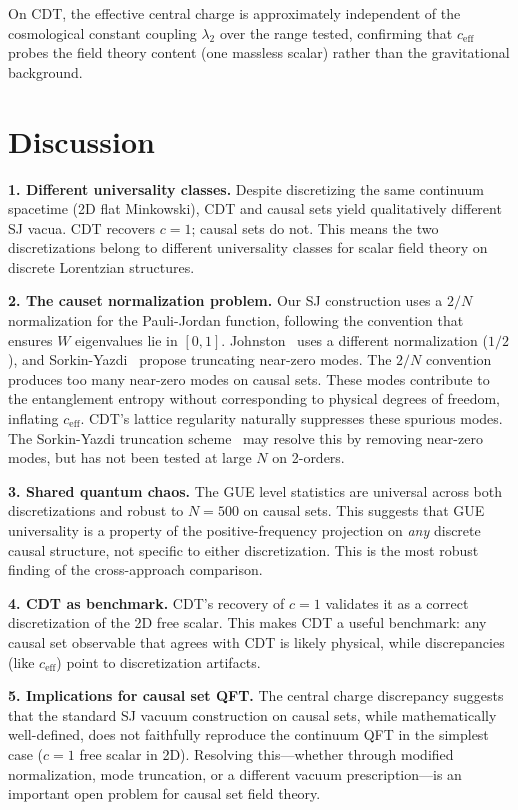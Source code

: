 \documentclass[aps,prd,twocolumn,superscriptaddress,nofootinbib]{revtex4-2}
\begin{document}
On CDT, the effective central charge is approximately independent of the cosmological constant coupling $\lambda_2$ over the range tested, confirming that $c_{\mathrm{eff}}$ probes the field theory content (one massless scalar) rather than the gravitational background.

\section{Discussion}

\textbf{1. Different universality classes.} Despite discretizing the same continuum spacetime (2D flat Minkowski), CDT and causal sets yield qualitatively different SJ vacua. CDT recovers $c = 1$; causal sets do not. This means the two discretizations belong to different universality classes for scalar field theory on discrete Lorentzian structures.

\textbf{2. The causet normalization problem.} Our SJ construction uses a $2/N$ normalization for the Pauli-Jordan function, following the convention that ensures $W$ eigenvalues lie in $[0,1]$. Johnston~\cite{johnston2009} uses a different normalization ($1/2$), and Sorkin-Yazdi~\cite{sorkin_yazdi2018} propose truncating near-zero modes. The $2/N$ convention produces too many near-zero modes on causal sets. These modes contribute to the entanglement entropy without corresponding to physical degrees of freedom, inflating $c_{\mathrm{eff}}$. CDT's lattice regularity naturally suppresses these spurious modes. The Sorkin-Yazdi truncation scheme~\cite{sorkin_yazdi2018} may resolve this by removing near-zero modes, but has not been tested at large $N$ on 2-orders.

\textbf{3. Shared quantum chaos.} The GUE level statistics are universal across both discretizations and robust to $N = 500$ on causal sets. This suggests that GUE universality is a property of the positive-frequency projection on \emph{any} discrete causal structure, not specific to either discretization. This is the most robust finding of the cross-approach comparison.

\textbf{4. CDT as benchmark.} CDT's recovery of $c = 1$ validates it as a correct discretization of the 2D free scalar. This makes CDT a useful benchmark: any causal set observable that agrees with CDT is likely physical, while discrepancies (like $c_{\mathrm{eff}}$) point to discretization artifacts.

\textbf{5. Implications for causal set QFT.} The central charge discrepancy suggests that the standard SJ vacuum construction on causal sets, while mathematically well-defined, does not faithfully reproduce the continuum QFT in the simplest case ($c = 1$ free scalar in 2D). Resolving this---whether through modified normalization, mode truncation, or a different vacuum prescription---is an important open problem for causal set field theory.
\end{document}
